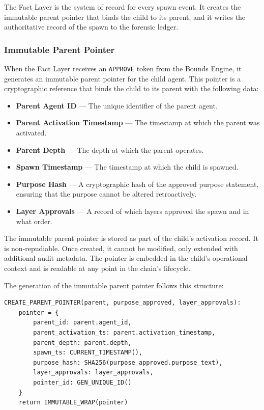 The Fact Layer is the system of record for every spawn event. It creates the immutable parent pointer that binds the child to its parent, and it writes the authoritative record of the spawn to the forensic ledger.

\subsubsection{Immutable Parent Pointer}

When the Fact Layer receives an \texttt{APPROVE} token from the Bounds Engine, it generates an immutable parent pointer for the child agent. This pointer is a cryptographic reference that binds the child to its parent with the following data:

\begin{itemize}
    \item \textbf{Parent Agent ID} — The unique identifier of the parent agent.
    \item \textbf{Parent Activation Timestamp} — The timestamp at which the parent was activated.
    \item \textbf{Parent Depth} — The depth at which the parent operates.
    \item \textbf{Spawn Timestamp} — The timestamp at which the child is spawned.
    \item \textbf{Purpose Hash} — A cryptographic hash of the approved purpose statement, ensuring that the purpose cannot be altered retroactively.
    \item \textbf{Layer Approvals} — A record of which layers approved the spawn and in what order.
\end{itemize}

The immutable parent pointer is stored as part of the child's activation record. It is non-repudiable. Once created, it cannot be modified, only extended with additional audit metadata. The pointer is embedded in the child's operational context and is readable at any point in the chain's lifecycle.

The generation of the immutable parent pointer follows this structure:

\begin{verbatim}
CREATE_PARENT_POINTER(parent, purpose_approved, layer_approvals):
    pointer = {
        parent_id: parent.agent_id,
        parent_activation_ts: parent.activation_timestamp,
        parent_depth: parent.depth,
        spawn_ts: CURRENT_TIMESTAMP(),
        purpose_hash: SHA256(purpose_approved.purpose_text),
        layer_approvals: layer_approvals,
        pointer_id: GEN_UNIQUE_ID()
    }
    return IMMUTABLE_WRAP(pointer)
\end{verbatim}

